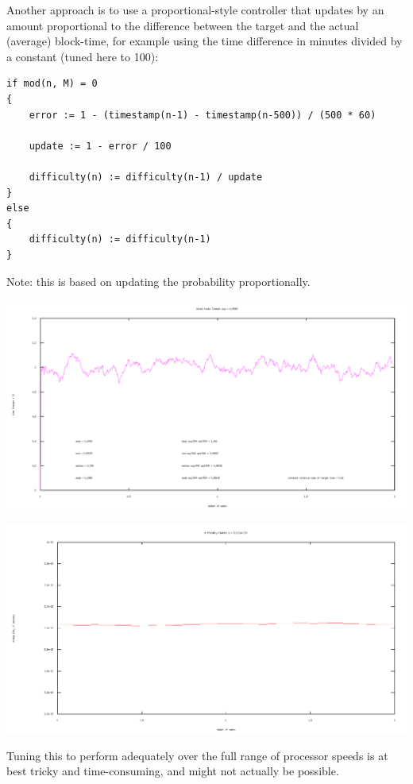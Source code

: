 \documentclass[10pt,a4paper]{article}
\begin{document}
\newpage

Another approach is to use a proportional-style controller that updates by an amount proportional to the difference between the target and the actual (average) block-time, for example using the time difference in minutes divided by a constant (tuned here to 100):

\begin{verbatim}
if mod(n, M) = 0
{
    error := 1 - (timestamp(n-1) - timestamp(n-500)) / (500 * 60)
        
    update := 1 - error / 100

    difficulty(n) := difficulty(n-1) / update
}
else
{
    difficulty(n) := difficulty(n-1)
}
\end{verbatim}
Note: this is based on updating the probability proportionally.

\includegraphics[width=14cm]{SimulationGraphs/simulation_avg-500_upd-500_Pcontroller.png}

\includegraphics[width=14cm]{SimulationGraphs/simulation_avg-500_upd-500_Pcontroller_diff.png}

Tuning this to perform adequately over the full range of processor speeds is at best tricky and time-consuming, and might not actually be possible.
\end{document}

